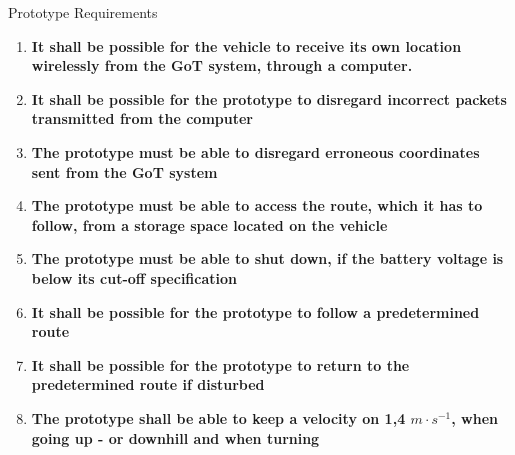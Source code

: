 \begin{frame}{Prototype Requirements}
  \begin{enumerate}
\footnotesize
\item \textbf{It shall be possible for the vehicle to receive its own location wirelessly from the GoT system, through a computer.}
\item \textbf{It shall be possible for the prototype to disregard incorrect packets transmitted from the computer}
	\item \textbf{The prototype must be able to disregard erroneous coordinates sent from the GoT system}
\item \textbf{The prototype must be able to access the route, which it has to follow, from a storage space located on the vehicle}
\item \textbf{The prototype must be able to shut down, if the battery voltage is below its cut-off specification}
\item \textbf{It shall be possible for the prototype to follow a predetermined route}
\item \textbf{It shall be possible for the prototype to return to the predetermined route if disturbed}
\item \textbf{The prototype shall be able to keep a velocity on 1,4 $m \cdot s^{-1}$, when going up - or downhill and when turning}
\end{enumerate}
\end{frame}
